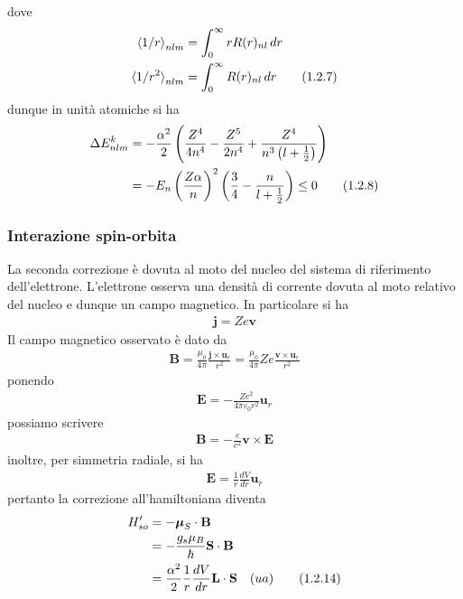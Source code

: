 \documentclass{article}
\begin{document}
dove
\begin{align}
    \braket{1/r}_{nlm} &= \int_0^\infty rR(r)_{nl} \, dr \notag \\
    \braket{1/r^2}_{nlm} &= \int_0^\infty R(r)_{nl} \, dr \tag{1.2.7}
\end{align}
dunque in unità atomiche si ha
\begin{align}
    \Delta E^k_{nlm} &= -\frac{\alpha^2}{2}\left(\frac{Z^4}{4n^4} - \frac{Z^5}{2n^4} + \frac{Z^4}{n^3\left(l + \frac{1}{2}\right)}\right) \notag \\
    &= -E_n\left(\frac{Z\alpha}{n}\right)^2\left(\frac{3}{4} - \frac{n}{l + \frac{1}{2}}\right) \leq 0 \tag{1.2.8}
\end{align}
\subsubsection*{Interazione spin-orbita}
La seconda correzione è dovuta al moto del nucleo del sistema di riferimento dell'elettrone. L'elettrone osserva una densità di corrente dovuta al moto relativo del nucleo e dunque un campo magnetico. In particolare si ha 
\begin{align}
    \mathbf{j} = Ze\mathbf{v} \tag{1.2.9}
\end{align}
Il campo magnetico osservato è dato da
\begin{align}
    \mathbf{B} = \frac{\mu_0}{4\pi}\frac{\mathbf{j} \times \mathbf{u}_r}{r^2} = \frac{\mu_0}{4\pi}Ze\frac{\mathbf{v} \times \mathbf{u}_r}{r^2} \tag{1.2.10}
\end{align}
ponendo
\begin{align}
    \mathbf{E} = -\frac{Ze^2}{4\pi\varepsilon_0r^2}\mathbf{u}_r \tag{1.2.11}
\end{align}
possiamo scrivere
\begin{align}
    \mathbf{B} = -\frac{e}{c^2}\mathbf{v} \times \mathbf{E} \tag{1.2.12}
\end{align}
inoltre, per simmetria radiale, si ha
\begin{align}
    \mathbf{E} = \frac{1}{r}\frac{dV}{dr}\mathbf{u}_r \tag{1.2.13}
\end{align}
pertanto la correzione all'hamiltoniana diventa
\begin{align}
    H'_{so} &= -\boldsymbol{\mu}_S \cdot \mathbf{B} \notag \\
    &= -\frac{g_s\mu_B}{\hbar}\mathbf{S} \cdot \mathbf{B} \notag \\
    &= \frac{\alpha^2}{2}\frac{1}{r}\frac{dV}{dr}\mathbf{L} \cdot \mathbf{S} \quad (ua) \tag{1.2.14}
\end{align}
\end{document}
